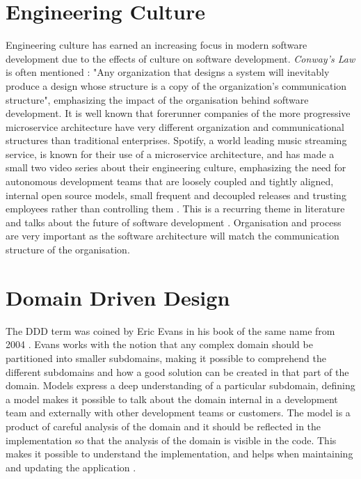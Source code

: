 \section{Engineering Culture}
Engineering culture has earned an increasing focus in modern software development due to the effects of culture on software development. \textit{Conway's Law} is often mentioned \cite{newman2014demystifying}:  "Any organization that designs a system will inevitably produce a design whose structure is a copy of the organization's communication structure", emphasizing the impact of the organisation behind software development. It is well known that forerunner companies of the more progressive microservice architecture have very different organization and communicational structures than traditional enterprises. Spotify, a world leading music streaming service, is known for their use of a microservice architecture, and has made a small two video series about their engineering culture, emphasizing the need for autonomous development teams that are loosely coupled and tightly aligned, internal open source models, small frequent and decoupled releases and trusting employees rather than controlling them  \cite{kniberg2014spotify}. This is a recurring theme in literature and talks about the future of software development \cite[p.~5]{nygard2007release} \cite[p.13]{newman2015microservices} \cite[t.~34:32]{george2016it} \cite{fowler2014microservices} \cite[t.~25:30]{fowler2014microservicesoamonolith}. Organisation and process are very important as the software architecture will match the communication structure of the organisation.


\section{Domain Driven Design}
\label{sec:DDD}
The DDD term was coined by Eric Evans in his book of the same name from 2004 \cite[preface]{evans2004domain}. Evans works with the notion that any complex domain should be partitioned into smaller subdomains, making it possible to comprehend the different subdomains and how a good solution can be created in that part of the domain. Models express a deep understanding of a particular subdomain, defining a model makes it possible to talk about the domain internal in a development team and externally with other development teams or customers. The model is a product of careful analysis of the domain and it should be reflected in the implementation so that the analysis of the domain is visible in the code. This makes it possible to understand the implementation, and helps when maintaining and updating the application \cite[p.~2]{evans2004domain}.

